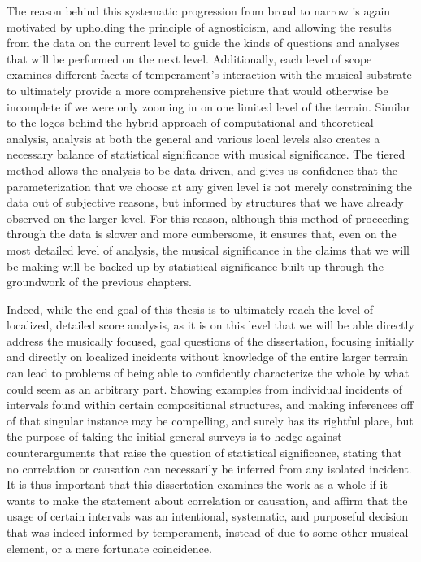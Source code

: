 The reason behind this systematic progression from broad to narrow is
again motivated by upholding the principle of agnosticism, and allowing
the results from the data on the current level to guide the kinds of
questions and analyses that will be performed on the next level.
Additionally, each level of scope examines different facets of
temperament's interaction with the musical substrate to ultimately
provide a more comprehensive picture that would otherwise be incomplete
if we were only zooming in on one limited level of the terrain. Similar
to the logos behind the hybrid approach of computational and theoretical
analysis, analysis at both the general and various local levels also
creates a necessary balance of statistical significance with musical
significance. The tiered method allows the analysis to be data driven,
and gives us confidence that the parameterization that we choose at any
given level is not merely constraining the data out of subjective
reasons, but informed by structures that we have already observed on the
larger level. For this reason, although this method of proceeding
through the data is slower and more cumbersome, it ensures that, even on
the most detailed level of analysis, the musical significance in the
claims that we will be making will be backed up by statistical
significance built up through the groundwork of the previous chapters.

Indeed, while the end goal of this thesis is to ultimately reach the
level of localized, detailed score analysis, as it is on this level that
we will be able directly address the musically focused, goal questions
of the dissertation, focusing initially and directly on localized
incidents without knowledge of the entire larger terrain can lead to
problems of being able to confidently characterize the whole by what
could seem as an arbitrary part. Showing examples from individual
incidents of intervals found within certain compositional structures,
and making inferences off of that singular instance may be compelling,
and surely has its rightful place, but the purpose of taking the initial
general surveys is to hedge against counterarguments that raise the
question of statistical significance, stating that no correlation or
causation can necessarily be inferred from any isolated incident. It is
thus important that this dissertation examines the work as a whole if it
wants to make the statement about correlation or causation, and affirm
that the usage of certain intervals was an intentional, systematic, and
purposeful decision that was indeed informed by temperament, instead of
due to some other musical element, or a mere fortunate coincidence.

